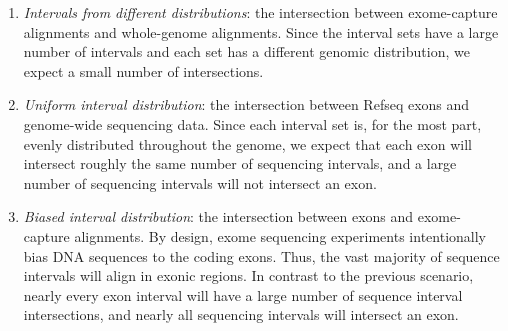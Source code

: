 \documentclass{bioinfo}
\begin{document}
                \begin{enumerate}
                        \item

                        {\em Intervals from different distributions}: the 
                        intersection between exome-capture alignments and 
                        whole-genome alignments. Since the interval sets have 
                        a large number of intervals and each set has a 
                        different genomic distribution, we expect a small 
                        number of intersections.
                        
                        \item
                        {\em Uniform interval distribution}: the intersection 
                        between Refseq exons and genome-wide sequencing data.  
                        Since each interval set is, for the most part, 
                        evenly distributed throughout the genome, we expect 
                        that each exon will intersect roughly the same number of 
                        sequencing intervals, and a large number of sequencing 
                        intervals will not intersect an exon.

                        \item
                        {\em Biased interval distribution}:  the intersection 
                        between exons and exome-capture alignments. By design, 
                        exome sequencing experiments intentionally bias DNA 
                        sequences to the coding exons. Thus, the vast majority 
                        of sequence intervals will align in exonic regions. In
                        contrast to the previous scenario, nearly every exon 
                        interval will have a large number of sequence interval
                        intersections, and nearly all sequencing intervals will 
                        intersect an exon.
                \end{enumerate}
\end{document}
